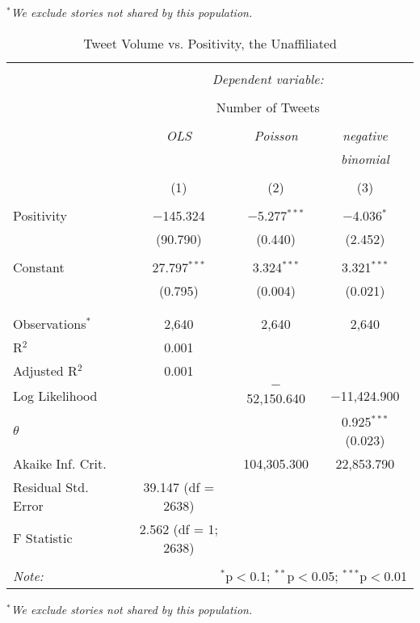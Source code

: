 \emph{$^{*}$We exclude stories not shared by this population.}  
\newpage 
\begin{table}[!htbp] \centering 
  \caption{Tweet Volume vs. Positivity, the Unaffiliated} 
  \label{} 
    \begin{tabular}{@{\extracolsep{5pt}}lccc} 
    \\[-1.8ex]\hline 
    \hline \\[-1.8ex] 
     & \multicolumn{3}{c}{\textit{Dependent variable:}} \\ 
    \cline{2-4} 
    \\[-1.8ex] & \multicolumn{3}{c}{Number of Tweets} \\ 
    \\[-1.8ex] & \textit{OLS} & \textit{Poisson} & \textit{negative} \\ 
     & \textit{} & \textit{} & \textit{binomial} \\ 
    \\[-1.8ex] & (1) & (2) & (3)\\ 
    \hline \\[-1.8ex] 
     Positivity & $-$145.324 & $-$5.277$^{***}$ & $-$4.036$^{*}$ \\ 
      & (90.790) & (0.440) & (2.452) \\ 
      & & & \\ 
     Constant & 27.797$^{***}$ & 3.324$^{***}$ & 3.321$^{***}$ \\ 
      & (0.795) & (0.004) & (0.021) \\ 
      & & & \\ 
    \hline \\[-1.8ex] 
    Observations$^{*}$ & 2,640 & 2,640 & 2,640 \\ 
    R$^{2}$ & 0.001 &  &  \\ 
    Adjusted R$^{2}$ & 0.001 &  &  \\ 
    Log Likelihood &  & $-$52,150.640 & $-$11,424.900 \\ 
    $\theta$ &  &  & 0.925$^{***}$  (0.023) \\ 
    Akaike Inf. Crit. &  & 104,305.300 & 22,853.790 \\ 
    Residual Std. Error & 39.147 (df = 2638) &  &  \\ 
    F Statistic & 2.562 (df = 1; 2638) &  &  \\ 
    \hline 
    \hline \\[-1.8ex] 
    \textit{Note:}  & \multicolumn{3}{r}{$^{*}$p$<$0.1; $^{**}$p$<$0.05; $^{***}$p$<$0.01} \\ 
    \end{tabular} 
\end{table}
\emph{$^{*}$We exclude stories not shared by this population.} 
\newpage 

